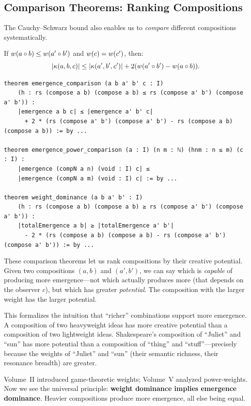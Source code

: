 \subsection{Comparison Theorems: Ranking Compositions}

The Cauchy--Schwarz bound also enables us to \emph{compare} different
compositions systematically.

\begin{theorem}
\label{thm:emergence-comparison}
If $w(a \circ b) \leq w(a' \circ b')$ and $w(c) =
w(c')$, then:
\[
  |\kappa(a, b, c)| \leq |\kappa(a', b', c')| + 2(w(a' \circ b') - w(a \circ b)).
\]
\end{theorem}

\begin{lstlisting}[caption={Comparison theorems (IDT\_v3\_Emergence.lean)}]
theorem emergence_comparison (a b a' b' c : I)
    (h : rs (compose a b) (compose a b) ≤ rs (compose a' b') (compose a' b')) :
    |emergence a b c| ≤ |emergence a' b' c|
      + 2 * (rs (compose a' b') (compose a' b') - rs (compose a b) (compose a b)) := by ...

theorem emergence_power_comparison (a : I) (n m : ℕ) (hnm : n ≤ m) (c : I) :
    |emergence (compN a n) (void : I) c| ≤
    |emergence (compN a m) (void : I) c| := by ...

theorem weight_dominance (a b a' b' : I)
    (h : rs (compose a b) (compose a b) ≥ rs (compose a' b') (compose a' b')) :
    |totalEmergence a b| ≥ |totalEmergence a' b'|
      - 2 * (rs (compose a b) (compose a b) - rs (compose a' b') (compose a' b')) := by ...
\end{lstlisting}

\begin{interpretation}
These comparison theorems let us rank compositions by their creative potential.
Given two compositions $(a, b)$ and $(a', b')$, we can say which is
\emph{capable} of producing more emergence---not which actually produces more
(that depends on the observer $c$), but which has greater \emph{potential}.
The composition with the larger weight has the larger potential.

This formalizes the intuition that ``richer'' combinations support more
emergence. A composition of two heavyweight ideas has more creative potential
than a composition of two lightweight ideas. Shakespeare's composition of
``Juliet'' and ``sun'' has more potential than a composition of ``thing'' and
``stuff''---precisely because the weights of ``Juliet'' and ``sun'' (their
semantic richness, their resonance breadth) are greater.

Volume~II introduced game-theoretic weights; Volume~V analyzed power-weights.
Now we see the universal principle: \textbf{weight dominance implies
emergence dominance}. Heavier compositions produce more emergence, all else
being equal.
\end{interpretation}


